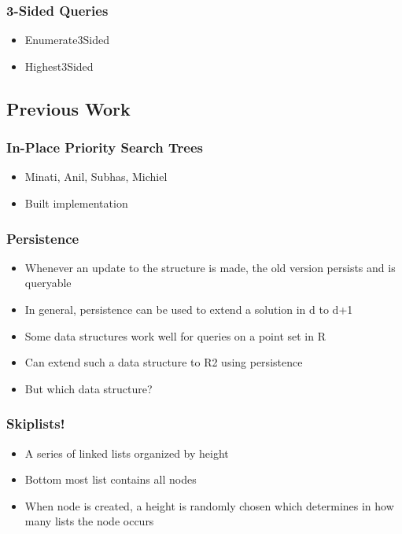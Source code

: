 \documentclass{beamer}
\begin{document}
\begin{frame}
  \frametitle{3-Sided Queries}

  \begin{itemize}
  \item
    Enumerate3Sided
  \item
    Highest3Sided
  \end{itemize}
\end{frame}

\subsection{Previous Work}

\begin{frame}
  \frametitle{In-Place Priority Search Trees}
  \begin{itemize}
  \item
    Minati, Anil, Subhas, Michiel
  \item
    Built implementation
  \end{itemize}
\end{frame}

\begin{frame}
  \frametitle{Persistence}

  \begin{itemize}
  \item
    Whenever an update to the structure is made, the old version persists
    and is queryable
  \item
    In general, persistence can be used to extend a solution in d to d+1
  \item
    Some data structures work well for queries on a point set in R
  \item
    Can extend such a data structure to R2 using persistence
  \item
    But which data structure?
  \end{itemize}
\end{frame}

\begin{frame}
  \frametitle{Skiplists!}

  \begin{itemize}
  \item
    A series of linked lists organized by height
  \item
    Bottom most list contains all nodes
  \item
    When node is created, a height is randomly chosen which determines in
    how many lists the node occurs
  \end{itemize}
\end{frame}
\end{document}
